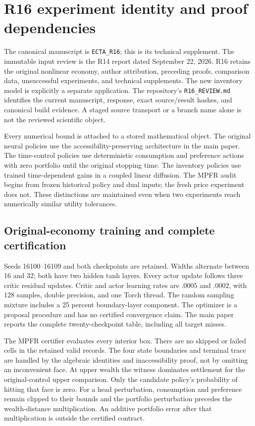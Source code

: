 \section{R16 experiment identity and proof dependencies}
The canonical manuscript is \texttt{ECTA\_R16}; this is its technical supplement. The immutable input review is the R14 report dated September 22, 2026. R16 retains the original nonlinear economy, author attribution, preceding proofs, comparison data, unsuccessful experiments, and technical supplements. The new inventory model is explicitly a separate application. The repository's \texttt{R16\_REVIEW.md} identifies the current manuscript, response, exact source/result hashes, and canonical build evidence. A staged source transport or a branch name alone is not the reviewed scientific object.

Every numerical bound is attached to a stored mathematical object. The original neural policies use the accessibility-preserving architecture in the main paper. The time-control policies use deterministic consumption and preference actions with zero portfolio until the original stopping time. The inventory policies use trained time-dependent gains in a coupled linear diffusion. The MPFR audit begins from frozen historical policy and dual inputs; the fresh price experiment does not. These distinctions are maintained even when two experiments reach numerically similar utility tolerances.

\subsection{Original-economy training and complete certification}
Seeds 16100--16109 and both checkpoints are retained. Widths alternate between 16 and 32; both have two hidden tanh layers. Every actor update follows three critic residual updates. Critic and actor learning rates are $.0005$ and $.0002$, with 128 samples, double precision, and one Torch thread. The random sampling mixture includes a 25 percent boundary-layer component. The optimizer is a proposal procedure and has no certified convergence claim. The main paper reports the complete twenty-checkpoint table, including all target misses.

The MPFR certifier evaluates every interior box. There are no skipped or failed cells in the retained valid records. The four state boundaries and terminal trace are handled by the algebraic identities and inaccessibility proof, not by omitting an inconvenient face. At upper wealth the witness dominates settlement for the original-control upper comparison. Only the candidate policy's probability of hitting that face is zero. For a head perturbation, consumption and preference remain clipped to their bounds and the portfolio perturbation precedes the wealth-distance multiplication. An additive portfolio error after that multiplication is outside the certified contract.


